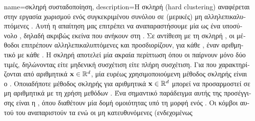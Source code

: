 {name={\foreignlanguage{greek}{σκληρή συσταδοποίηση}}, 
	description={\foreignlanguage{greek}{Η σκληρή}  
		(hard clustering) \foreignlanguage{greek}{αναφέρεται στην εργασία χωρισμού ενός συγκεκριμένου συνόλου}  
		\foreignlanguage{greek}{σε (μερικές) μη αλληλεπικαλυπτόμενες} . 
		\foreignlanguage{greek}{Αυτή η α\-παί\-τηση μας επιτρέπει να αναπαραστήσουμε μία}  \foreignlanguage{greek}{ως 
		ένα υποσύνολο} , \foreignlanguage{greek}{δηλαδή ακριβώς εκείνα που ανήκουν στη} . 
		\foreignlanguage{greek}{Σε αντίθεση με τη σκληρή} , \foreignlanguage{greek}{οι μέθοδοι}  
		\foreignlanguage{greek}{επιτρέπουν αλληλεπικαλυπτόμενες}  \foreignlanguage{greek}{και προσδιορίζουν, για κάθε}
		, \foreignlanguage{greek}{έναν αριθμητικό}  \foreignlanguage{greek}{με κάθε} . 
		\foreignlanguage{greek}{Η σκληρή}  \foreignlanguage{greek}{αποτελεί μία ακραία περίπτωση}  
		\foreignlanguage{greek}{όπου οι}  \foreignlanguage{greek}{παίρνουν μόνο δύο τιμές, δηλώνοντας είτε μηδενική 
		συσχέτιση είτε πλήρη συσχέτιση. Για}  \foreignlanguage{greek}{που χαρακτηρίζονται από αριθμητικά}  
		 ${\bf x} \in \mathbb{R}^{d}$, \foreignlanguage{greek}{μία ευρέως χρησιμοποιούμενη μέθοδος σκληρής} 
		 \foreignlanguage{greek}{είναι ο} . \foreignlanguage{greek}{Οποιαδήποτε μέθοδος σκληρής} 
		 \foreignlanguage{greek}{για αριθμητικά}  ${\bf x} \in \mathbb{R}^{d}$ 
		\foreignlanguage{greek}{μπορεί να προσαρμοστεί σε μη αριθμητικά}  \foreignlanguage{greek}{με τη χρήση 
		μεθόδων} . \foreignlanguage{greek}{Ένα σημαντικό παράδειγμα αυτής της προσέγγισης είναι η} 
		, \foreignlanguage{greek}{όπου}  \foreignlanguage{greek}{διαθέτουν μία δομή 
		ομοιότητας υπό τη μορφή ενός} . \foreignlanguage{greek}{Οι κόμβοι αυτού του}  
		\foreignlanguage{greek}{αναπαριστούν τα}  \foreignlanguage{greek}{ενώ οι μη κατευθυνόμενες (ενδεχομένως 
}}}
